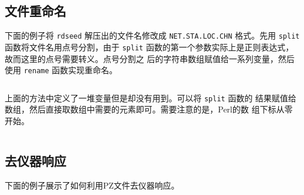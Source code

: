 \subsection{文件重命名}
\label{subsec:rename-in-perl}
下面的例子将 \texttt{rdseed} 解压出的文件名修改成 \texttt{NET.STA.LOC.CHN}
格式。先用 \texttt{split} 函数将文件名用点号分割，由于 \texttt{split}
函数的第一个参数实际上是正则表达式，故而这里的点号需要转义。点号分割之
后的字符串数组赋值给一系列变量，然后使用 \texttt{rename} 函数实现重命名。
\inputminted{perl}{./call-in-script/rename1.pl}

上面的方法中定义了一堆变量但是却没有用到。可以将 \texttt{split} 函数的
结果赋值给数组，然后直接取数组中需要的元素即可。需要注意的是，Perl的数
组下标从零开始。
\inputminted{perl}{./call-in-script/rename2.pl}

\subsection{去仪器响应}
下面的例子展示了如何利用PZ文件去仪器响应。
\inputminted{perl}{./call-in-script/transfer.pl}
